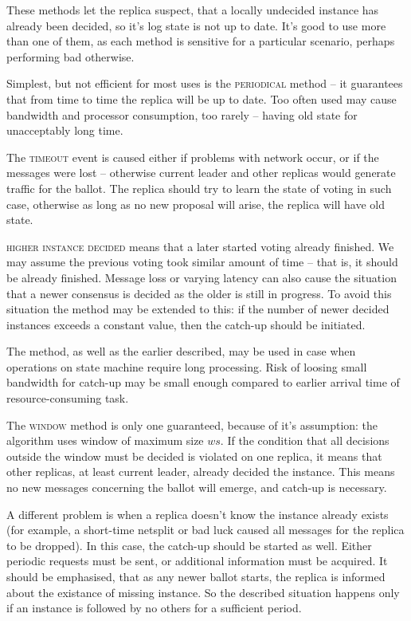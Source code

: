 These methods let the replica suspect, that a locally undecided instance has already been decided, so it's log state is not up to date. It's good to use more than one of them, as each method is sensitive for a particular scenario, perhaps performing bad otherwise.

Simplest, but not efficient for most uses is the \textsc{periodical} method -- it guarantees that from time to time the replica will be up to date.
Too often used may cause bandwidth and processor consumption, too rarely -- having old state for unacceptably long time.

The \textsc{timeout} event is caused either if problems with network occur, or if the \accept messages were lost -- otherwise current leader and other replicas would generate traffic for the ballot. The replica should try to learn the state of voting in such case, otherwise as long as no new proposal will arise, the replica will have old state.

\textsc{higher instance decided} means that a later started voting already finished. We may assume the previous voting took similar amount of time -- that is, it should be already finished. Message loss or varying latency can also cause the situation that a newer consensus is decided as the older is still in progress. To avoid this situation the method may be extended to this: if the number of newer decided instances exceeds a constant value, then the catch-up should be initiated.

The method, as well as the earlier described, may be used in case when operations on state machine require long processing. Risk of loosing small bandwidth for catch-up may be small enough compared to earlier arrival time of resource-consuming task.

The \textsc{window} method is only one guaranteed, because of it's assumption: the algorithm uses window of maximum size $ws$. If the condition that all decisions outside the window must be decided is violated on one replica, it means that other replicas, at least current leader, already decided the instance. This means no new messages concerning the ballot will emerge, and catch-up is necessary.


A different problem is when a replica doesn't know the instance already exists (for example, a short-time netsplit or bad luck caused all messages for the replica to be dropped). In this case, the catch-up should be started as well.
Either periodic requests must be sent, or additional information must be acquired. It should be emphasised, that as any newer ballot starts, the replica is informed about the existance of missing instance. So the described situation happens only if an instance is followed by no others for a sufficient period.

